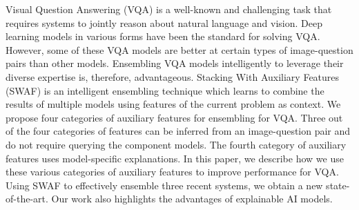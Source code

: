 Visual Question Answering (VQA) is a well-known and challenging task that requires systems to jointly reason about natural language and vision. Deep learning models in various forms have been the standard for solving VQA. However, some of these VQA models are better at certain types of image-question pairs than other models. Ensembling VQA models intelligently to leverage their diverse expertise is, therefore, advantageous. Stacking With Auxiliary Features (SWAF) is an intelligent ensembling technique which learns to combine the results of multiple models using features of the current problem as context. We propose four categories of auxiliary features for ensembling for VQA. Three out of the four categories of features can be inferred from an image-question pair and do not require querying the component models. The fourth category of auxiliary features uses model-specific explanations. In this paper, we describe how we use these various categories of auxiliary features to improve performance for VQA. Using SWAF to effectively ensemble three recent systems, we obtain a new state-of-the-art. Our work also highlights the advantages of explainable AI models.
